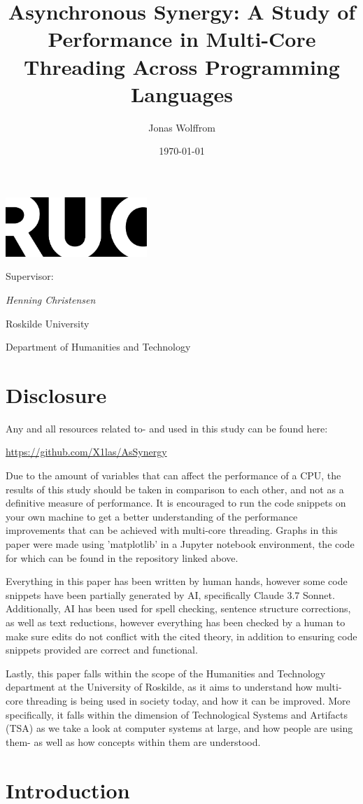 \documentclass[12pt,a4paper]{article}
\title{Asynchronous Synergy: A Study of Performance in Multi-Core Threading Across Programming Languages}
\author{Jonas Wolffrom}
\date{\today}
\renewcommand{\maketitle}{
  \begin{titlepage}
    \centering
    \vspace*{1cm}
    
    \includegraphics[width=0.4\textwidth]{ruc_logo.png}\\[2cm]
    
    {\LARGE\bfseries\thetitle\par}
    \vspace{1.5cm}
    
    {\Large\theauthor\par}
    \vspace{1cm}
    {\large Supervisor: \par}
    {\large\textit{Henning Christensen}\par}   
    \vspace{1cm}
    
    {\large\thedate\par}
    \vfill
    
    {\large Roskilde University\par}
    {\large Department of Humanities and Technology\par}
    \vspace{0.5cm}
  \end{titlepage}
}
\begin{document}
\maketitle
\newpage

\begin{abstract}

\end{abstract}
\newpage

\tableofcontents
\newpage

\section{Disclosure}

Any and all resources related to- and used in this study can be found here:

\begin{center}
    \href{https://github.com/X1las/AsSynergy}{https://github.com/X1las/AsSynergy}
\end{center}

Due to the amount of variables that can affect the performance of a CPU, the results of this study should be taken in comparison to each other, and not as a definitive measure of performance. It is encouraged to run the code snippets on your own machine to get a better understanding of the performance improvements that can be achieved with multi-core threading. Graphs in this paper were made using 'matplotlib' in a Jupyter notebook environment, the code for which can be found in the repository linked above.

Everything in this paper has been written by human hands, however some code snippets have been partially generated by AI, specifically Claude 3.7 Sonnet. Additionally, AI has been used for spell checking, sentence structure corrections, as well as text reductions, however everything has been checked by a human to make sure edits do not conflict with the cited theory, in addition to ensuring code snippets provided are correct and functional.

Lastly, this paper falls within the scope of the Humanities and Technology department at the University of Roskilde, as it aims to understand how multi-core threading is being used in society today, and how it can be improved. More specifically, it falls within the dimension of Technological Systems and Artifacts (TSA) as we take a look at computer systems at large, and how people are using them- as well as how concepts within them are understood.

\section{Introduction}
\end{document}
